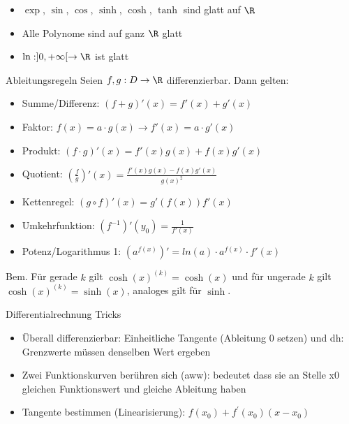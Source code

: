 \begin{itemize}
	\item $\exp$, $\sin$, $\cos$, $\sinh$, $\cosh$, $\tanh$ sind glatt auf $\R$
	\item Alle Polynome sind auf ganz $\R$ glatt
	\item $\ln : ]0, + \infty[ \to \R$ ist glatt
\end{itemize}


\begin{concept}{Ableitungsregeln}
    Seien $f,g: D \to \R$  differenzierbar. Dann gelten:
    \begin{itemize}
        \item Summe/Differenz: $(f + g)'(x) = f'(x) + g'(x)$
        \item Faktor: $f(x)=a\cdot g(x) \rightarrow f'(x)=a \cdot g'(x) $
        \item Produkt: $(f \cdot g)'(x) = f'(x)g(x) + f(x)g'(x)$
        \item Quotient: $(\frac{f}{g})'(x) = \frac{f'(x) g(x) - f(x) g'(x)}{g(x)^2}$
        \item Kettenregel: $(g \circ f)' (x) = g'(f(x)) f'(x)$
        \item Umkehrfunktion: $(f^{-1})'(y_0) = \frac{1}{f'(x)}$
        \item Potenz/Logarithmus 1: 
        $(a^{f(x)})' = ln(a) \cdot a^{f(x)} \cdot f'(x)$

    \end{itemize}
    Bem. Für gerade $k$ gilt $\cosh (x)^{(k)}=\cosh (x)$ und für ungerade $k$ gilt $\cosh (x)^{(k)}=\sinh (x)$, analoges gilt für $\sinh$.
\end{concept}

 \begin{KR}{Differentialrechnung Tricks}
        \begin{itemize}
      \item Überall differenzierbar: Einheitliche Tangente (Ableitung 0 setzen) und dh: Grenzwerte müssen denselben Wert ergeben
      \item Zwei Funktionskurven berühren sich (aww): bedeutet dass sie an Stelle x0 gleichen Funktionswert und gleiche Ableitung haben
      \item Tangente bestimmen (Linearisierung): $f(x_{0})+f^{\prime}(x_{0})(x-x_{0})$
    \end{itemize}
    \end{KR}

